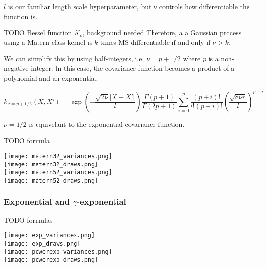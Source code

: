 $l$ is our familiar length scale hyperparameter, but $\nu$ controls how differentiable the function is. 

TODO Bessel function $K_{\nu}$, background needed
Therefore, a a Gaussian process using a Matern class kernel is $k$-times MS differentiable if and only if $\nu > k$. 

We can simplify this by using half-integers, i.e. $\nu = p + 1/2$ where $p$ is a non-negative integer. In this case, the covariance function becomes a product of a polynomial and an exponential:

\begin{equation*}
    k_{\nu = p + 1/2}(X,X') = \exp \left(- \frac{\sqrt{2\nu}|X - X'|}{l} \right) \frac{\Gamma(p+1)}{\Gamma(2p+1)} \sum_{i=0}^p \frac{(p + i)!}{i!(p-i)!} \left( \frac{\sqrt{8\nu r}}{l} \right)^{p-i}
\end{equation*}

$\nu = 1/2$ is equivelant to the exponential covariance function.

TODO formula

\texttt{[image: matern32\_variances.png]} \\
\texttt{[image: matern32\_draws.png]} \\


\texttt{[image: matern52\_variances.png]} \\
\texttt{[image: matern52\_draws.png]} \\


\subsubsection{Exponential and $\gamma$-exponential}
TODO formulas 

\texttt{[image: exp\_variances.png]} \\
\texttt{[image: exp\_draws.png]} \\

\texttt{[image: powerexp\_variances.png]} \\
\texttt{[image: powerexp\_draws.png]} \\

